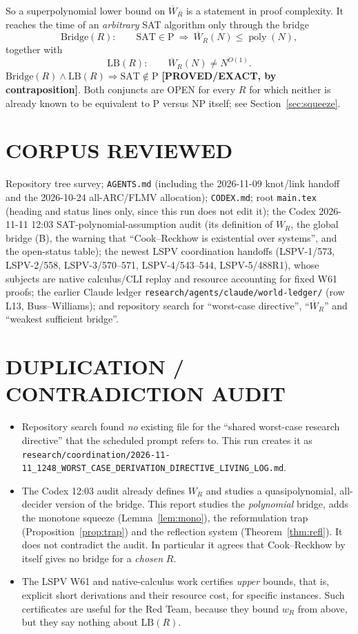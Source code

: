 \documentclass[11pt]{article}
\theoremstyle{definition}
\theoremstyle{remark}
\newcommand{\SAT}{\mathrm{SAT}}
\newcommand{\poly}{\operatorname{poly}}
\newcommand{\Wb}{\overline W}
\newcommand{\status}[1]{\textbf{[#1]}}
\begin{document}
So a superpolynomial lower bound on $\Wb_R$ is a statement in proof complexity.
It reaches the time of an \emph{arbitrary} SAT algorithm only through the
bridge
\[
 \mathrm{Bridge}(R):\qquad \SAT\in\mathrm P\ \Longrightarrow\ \Wb_R(N)\le\poly(N),
\]
together with
\[
 \mathrm{LB}(R):\qquad \Wb_R(N)\ne N^{O(1)}.
\]
$\mathrm{Bridge}(R)\wedge\mathrm{LB}(R)\Rightarrow\SAT\notin\mathrm P$
\status{PROVED/EXACT, by contraposition}. Both conjuncts are OPEN for every
$R$ for which neither is already known to be equivalent to P versus NP itself;
see Section~\ref{sec:squeeze}.

\section{CORPUS REVIEWED}
Repository tree survey; \texttt{AGENTS.md} (including the 2026-11-09
knot/link handoff and the 2026-10-24 all-ARC/FLMV allocation); \texttt{CODEX.md};
root \texttt{main.tex} (heading and status lines only, since this run does not
edit it); the Codex 2026-11-11 12:03 SAT-polynomial-assumption audit (its
definition of $W_R$, the global bridge (B), the warning that
``Cook--Reckhow is existential over systems'', and the open-status table);
the newest LSPV coordination handoffs
(LSPV-1/573, LSPV-2/558, LSPV-3/570--571, LSPV-4/543--544, LSPV-5/488R1),
whose subjects are native calculus/CLI replay and resource accounting for fixed
W61 proofs; the earlier Claude ledger \texttt{research/agents/claude/world-ledger/}
(row L13, Buss--Williams); and repository search for ``worst-case directive'',
``$\overline W_R$'' and ``weakest sufficient bridge''.

\section{DUPLICATION / CONTRADICTION AUDIT}
\begin{itemize}
\item Repository search found \emph{no} existing file for the ``shared worst-case
research directive'' that the scheduled prompt refers to. This run creates it as
\texttt{research/coordination/2026-11-11\_1248\_WORST\_CASE\_DERIVATION\_DIRECTIVE\_LIVING\_LOG.md}.
\item The Codex 12:03 audit already defines $W_R$ and studies a
quasipolynomial, all-decider version of the bridge. This report studies the
\emph{polynomial} bridge, adds the monotone squeeze (Lemma~\ref{lem:mono}), the
reformulation trap (Proposition~\ref{prop:trap}) and the reflection system
(Theorem~\ref{thm:refl}). It does not contradict the audit. In particular it
agrees that Cook--Reckhow by itself gives no bridge for a \emph{chosen} $R$.
\item The LSPV W61 and native-calculus work certifies \emph{upper} bounds, that
is, explicit short derivations and their resource cost, for specific
instances. Such certificates are useful for the Red Team, because they bound
$w_R$ from above, but they say nothing about $\mathrm{LB}(R)$.
\end{itemize}
\end{document}
